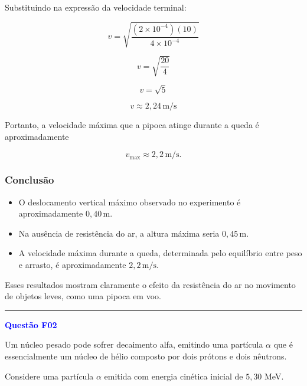 \documentclass[a4paper,12pt]{article}
\begin{document}
Substituindo na expressão da velocidade terminal:

\begin{equation}
v = \sqrt{\frac{(2 \times 10^{-4})(10)}{4 \times 10^{-4}}}
\end{equation}

\begin{equation}
v = \sqrt{\frac{20}{4}}
\end{equation}

\begin{equation}
v = \sqrt{5}
\end{equation}

\begin{equation}
v \approx 2{,}24\,\text{m/s}
\end{equation}

Portanto, a velocidade máxima que a pipoca atinge durante a queda é aproximadamente

\begin{equation}
v_{\max} \approx 2{,}2\,\text{m/s}.
\end{equation}

\subsubsection*{Conclusão}

\begin{itemize}
\item O deslocamento vertical máximo observado no experimento é aproximadamente \(0{,}40\,\text{m}\).
\item Na ausência de resistência do ar, a altura máxima seria \(0{,}45\,\text{m}\).
\item A velocidade máxima durante a queda, determinada pelo equilíbrio entre peso e arrasto, é aproximadamente \(2{,}2\,\text{m/s}\).
\end{itemize}

Esses resultados mostram claramente o efeito da resistência do ar no movimento de objetos leves, como uma pipoca em voo.

\noindent\rule{\textwidth}{1pt}

\textbf{\textcolor{blue}{\Large Questão F02}}

Um núcleo pesado pode sofrer decaimento alfa, emitindo uma partícula $\alpha$ que é essencialmente um núcleo de hélio composto por dois prótons e dois nêutrons.

Considere uma partícula $\alpha$ emitida com energia cinética inicial de $5{,}30$ MeV.
\end{document}
